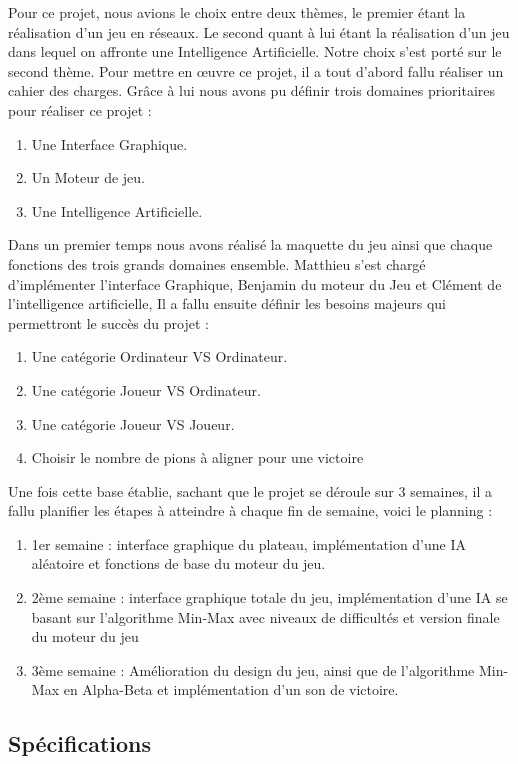 \documentclass[a4paper,oneside]{article}
\begin{document}
Pour ce projet, nous avions le choix entre deux thèmes, le premier étant la réalisation d'un jeu en réseaux.
Le second quant à lui étant la réalisation d'un jeu dans lequel on affronte une Intelligence Artificielle.
Notre choix s'est porté sur le second thème.
Pour mettre en œuvre ce projet, il a tout d'abord fallu réaliser un cahier des charges.
Grâce à lui nous avons pu définir trois domaines prioritaires pour réaliser ce projet :
\begin{enumerate}
	\item Une Interface Graphique.
	\item Un Moteur de jeu.
	\item Une Intelligence Artificielle.
\end{enumerate}
Dans un premier temps nous avons réalisé la maquette du jeu ainsi que chaque fonctions des trois grands domaines ensemble. Matthieu s'est chargé d'implémenter l'interface Graphique, Benjamin du moteur du Jeu et Clément de l'intelligence artificielle, 
Il a fallu ensuite définir les besoins majeurs qui permettront le succès du projet :
\begin{enumerate}
	\item Une catégorie Ordinateur VS Ordinateur.
	\item Une catégorie Joueur VS Ordinateur.
	\item Une catégorie Joueur VS Joueur.
	\item Choisir le nombre de pions à aligner pour une victoire
\end{enumerate}
Une fois cette base établie, sachant que le projet se déroule sur 3 semaines, il a fallu planifier les étapes à atteindre à chaque fin de semaine, voici le planning :
\begin{enumerate}
	\item 1er semaine : interface graphique du plateau, implémentation d'une IA aléatoire et fonctions de base du moteur du jeu.
	\item 2ème semaine : interface graphique totale du jeu, implémentation d'une IA se basant sur l'algorithme Min-Max avec niveaux de difficultés et version finale du moteur du jeu
	\item 3ème semaine : Amélioration du design du jeu, ainsi que de l'algorithme Min-Max en Alpha-Beta et implémentation d'un son de victoire.
\end{enumerate}

\clearpage

\subsection{Spécifications}
\end{document}
